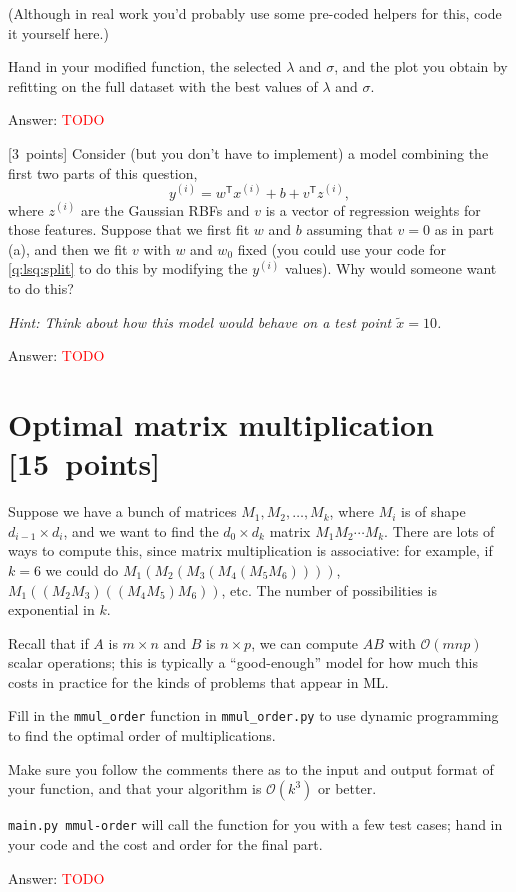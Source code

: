 \documentclass{article}
\newcommand{\ask}[1]{\textcolor{question}{#1}}
\newenvironment{answer}{\par\begingroup\color{answer}Answer: }{\endgroup}
\newcommand{\red}[1]{\textcolor{red}{#1}}
\newcommand{\pts}[1]{\textcolor{points}{[#1~points]}}
\newcommand{\hint}[1]{\textcolor{black!60!white}{\emph{Hint: #1}}}
\newcommand{\TODO}{\red{TODO}}
\newcommand{\bigO}{\mathcal{O}}
\newcommand{\tp}{^\mathsf{T}}
\begin{document}
\begin{qlist}
(Although in real work you'd probably use some pre-coded helpers for this, code it yourself here.)

\ask{Hand in your modified function, the selected $\lambda$ and $\sigma$, and the plot you obtain by refitting on the full dataset with the best values of $\lambda$ and $\sigma$.}

\begin{answer}\TODO\end{answer}


\item \pts{3} Consider (but you don't have to implement) a model combining the first two parts of this question,
\[
y^{(i)} = w\tp x^{(i)} + b + v\tp z^{(i)},
\]
where $z^{(i)}$ are the Gaussian RBFs and $v$ is a vector of regression weights for those features. Suppose that we first fit $w$ and $b$ assuming that $v=0$ as in part (a), and then we fit $v$ with $w$ and $w_0$ fixed (you could use your code for \cref{q:lsq:split} to do this by modifying the $y^{(i)}$ values). \ask{Why would someone want to do this?}

\hint{Think about how this model would behave on a test point $\tilde x = 10$.}

\begin{answer}\TODO\end{answer}
\end{qlist}


\clearpage
\section{Optimal matrix multiplication \pts{15}}

Suppose we have a bunch of matrices $M_1, M_2, \dots, M_k$,
where $M_i$ is of shape $d_{i-1} \times d_{i}$,
and we want to find the $d_0 \times d_{k}$ matrix $M_1 M_2 \cdots M_k$.
There are lots of ways to compute this, since matrix multiplication is associative:
for example, if $k=6$
we could do $M_1 (M_2 (M_3 (M_4 (M_5 M_6))))$,
$M_1 ((M_2 M_3) ((M_4 M_5) M_6))$,
etc. The number of possibilities is exponential in $k$.

Recall that
if $A$ is $m \times n$ and $B$ is $n \times p$,
we can compute $A B$ with $\bigO(m n p)$ scalar operations;
this is typically a ``good-enough'' model for how much this costs in practice for the kinds of problems that appear in ML.

    Fill in the \texttt{mmul\_order} function in \texttt{mmul\_order.py}
    to use dynamic programming to find the optimal order of multiplications.

    Make sure you follow the comments there as to the input and output format of your function,
    and that your algorithm is $\bigO(k^3)$ or better.

    \texttt{main.py mmul-order} will call the function for you with a few test cases;
    \ask{hand in your code and the cost and order for the final part}.
\begin{answer}\TODO\end{answer}
\end{document}
